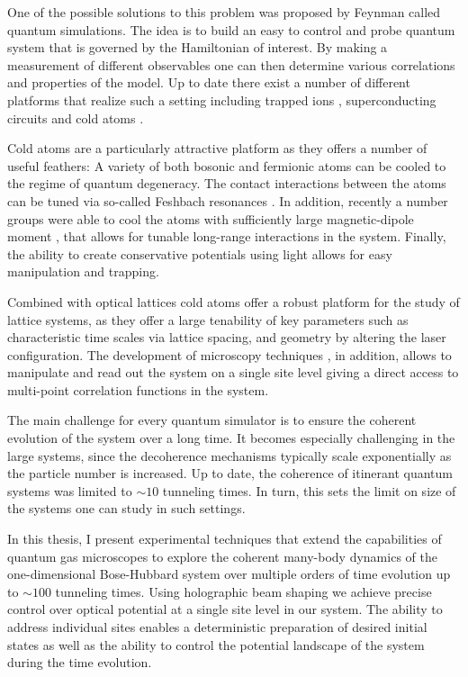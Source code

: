 One of the possible solutions to this problem was proposed by Feynman \cite{nt. J. Theor. Phys. 21,467 (1982)} called quantum simulations. The idea is to build an easy to control and probe quantum system that is governed by the Hamiltonian of interest. By making a measurement of different observables one can then determine various correlations and properties of the model. Up to date there exist a number of different platforms that realize such a setting including trapped ions \cite{Nature Phys.8, 277 (2012)}, superconducting circuits \cite{Nature Phys. 8, 292 (2012)} and cold atoms \cite{Nature Phys. 8, 267 (2012)}.

Cold atoms are a particularly attractive platform as they offers a number of useful feathers: A variety of both bosonic and fermionic atoms can be cooled to the regime of quantum degeneracy. The contact interactions between the atoms can be tuned via so-called Feshbach resonances \cite{Rev. Mod. Phys., 82:1225, 2010}. In addition, recently a number groups were able to cool the atoms with sufficiently large magnetic-dipole moment \cite{Phys. Rev. Lett. 107, 190401,  Phys. Rev. Lett. 108, 210401}, that allows for tunable long-range interactions in the system. Finally, the ability to create conservative potentials using light allows for easy manipulation and trapping.  

Combined with optical lattices cold atoms offer a robust platform for the study of lattice systems, as they offer a large tenability of key parameters such as characteristic time scales via lattice spacing, and geometry by altering the laser configuration. The development of microscopy techniques \cite{Bakr2009, Nature 467, 68 (2010)}, in addition, allows to manipulate and read out the system on a single site level giving a direct access to multi-point correlation functions in the system.

The main challenge for every quantum simulator is to ensure the coherent evolution of the system over a long time.
It becomes especially challenging in the large systems, since the decoherence mechanisms typically scale exponentially as the particle number is increased. Up to date, the coherence of itinerant quantum systems was limited to $\sim10$ tunneling times\cite{Smith2016}. In turn, this sets the limit on size of the systems one can study in such settings.

In this thesis, I present experimental techniques that extend the capabilities of quantum gas microscopes to explore the coherent many-body dynamics of the one-dimensional Bose-Hubbard system over multiple orders of time evolution up to $\sim 100$ tunneling times. Using holographic beam shaping we achieve precise control over optical potential at a single site level in our system. The ability to address individual sites enables a deterministic preparation of desired initial states as well as the ability to control the potential landscape of the system during the time evolution.

